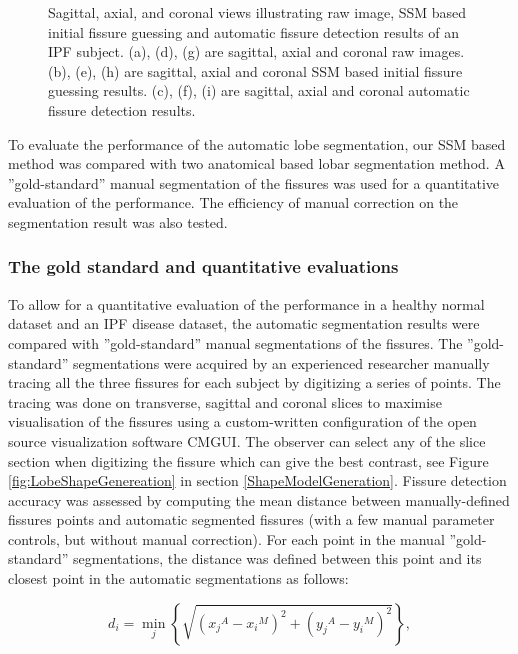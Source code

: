 {\begin{figure}[htbp]
\begin{subfigure}{.32\linewidth}
  \caption{}
  \label{fig:IPFSegmentationResults-i} 
\end{subfigure}
\caption{Sagittal, axial, and coronal views illustrating raw image, SSM based initial fissure guessing and automatic fissure detection results of an IPF subject. (a), (d), (g) are sagittal, axial and coronal raw images. (b), (e), (h) are sagittal, axial and coronal SSM based initial fissure guessing results. (c), (f), (i) are sagittal, axial and coronal automatic fissure detection results.}
\label{fig:IPFSegmentationResults}
\end{figure}

To evaluate the performance of the automatic lobe segmentation, our SSM based method was compared with two anatomical based lobar segmentation method. A ''gold-standard'' manual segmentation of the fissures was used for a quantitative evaluation of the performance. The efficiency of manual correction on the segmentation result was also tested.

\subsubsection{The gold standard and quantitative evaluations}
To allow for a quantitative evaluation of the performance in a healthy normal dataset and an IPF disease dataset, the automatic segmentation results were compared with ''gold-standard'' manual segmentations of the fissures. The ''gold-standard'' segmentations were acquired by an experienced researcher manually tracing all the three fissures for each subject by digitizing a series of points. The tracing was done on transverse, sagittal and coronal slices to maximise visualisation of the fissures using a custom-written configuration of the open source visualization software CMGUI. The observer can select any of the slice section when digitizing the fissure which can give the best contrast, see Figure \ref{fig:LobeShapeGenereation} in section \ref{ShapeModelGeneration}. Fissure detection accuracy was assessed by computing the mean distance between manually-defined fissures points and automatic segmented fissures (with a few manual parameter controls, but without manual correction). For each point in the manual ''gold-standard'' segmentations, the distance was defined between this point and its closest point in the automatic segmentations as follows:

\begin{equation}
\label{eq:Distance1}
d_i =  \operatorname*{min}\limits_{j}\left\{\sqrt{{({x_j}^A-{x_i}^M)}^2 + {({y_j}^A-{y_i}^M)}^2}\right\},
\end{equation}

}
